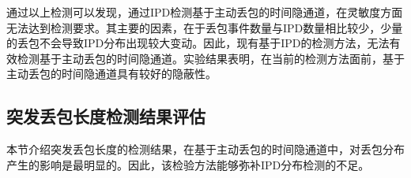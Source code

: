 通过以上检测可以发现，通过IPD检测基于主动丢包的时间隐通道，在灵敏度方面无法达到检测要求。其主要的因素，在于丢包事件数量与IPD数量相比较少，少量的丢包不会导致IPD分布出现较大变动。因此，现有基于IPD的检测方法，无法有效检测基于主动丢包的时间隐通道。实验结果表明，在当前的检测方法面前，基于主动丢包的时间隐通道具有较好的隐蔽性。

\subsection{突发丢包长度检测结果评估}
\label{chap:analyze:result:burst}

本节介绍突发丢包长度的检测结果，在基于主动丢包的时间隐通道中，对丢包分布产生的影响是最明显的。因此，该检验方法能够弥补IPD分布检测的不足。

